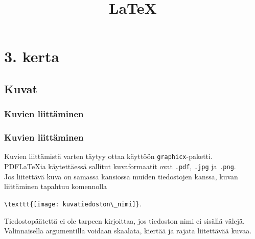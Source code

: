 \documentclass[handout]{beamer}
\title{\LaTeX}
\theoremstyle{remark}
\newcommand{\vaihto}{\\ \vspace{10pt}}
\begin{document}
\setcounter{section}{2}
\begin{frame}
\titlepage
\end{frame}
\begin{frame}
\tableofcontents
\end{frame}
\section{3. kerta}
\subsection{Kuvat}
\subsubsection{Kuvien liittäminen}
\begin{frame}[fragile]
\frametitle{Kuvien liittäminen}
Kuvien liittämistä varten täytyy ottaa käyttöön \verb-graphicx--paketti. 
\vaihto
PDFLaTeXia käytettäessä sallitut kuvaformaatit ovat \verb-.pdf-, \verb-.jpg- ja \verb-.png-. 
\vaihto
Jos liitettävä kuva on samassa kansiossa muiden tiedostojen kanssa, kuvan liittäminen tapahtuu komennolla
\begin{framed}
\centering
\verb-\texttt{[image: kuvatiedoston\_nimi]}-. 
\end{framed}
Tiedostopäätettä ei ole tarpeen kirjoittaa, jos tiedoston nimi ei sisällä välejä.
\vaihto
Valinnaisella argumentilla voidaan skaalata, kiertää ja rajata liitettävää kuvaa. 
\end{frame}
\end{document}
